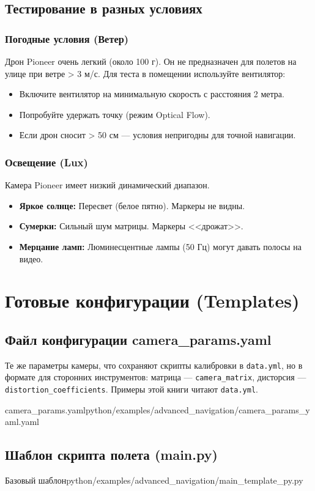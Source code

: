 \subsection{Тестирование в разных условиях}

\subsubsection{Погодные условия (Ветер)}
Дрон Pioneer очень легкий (около 100 г). Он не предназначен для полетов на улице при ветре > 3 м/с.
Для теста в помещении используйте вентилятор:
\begin{itemize}
    \item Включите вентилятор на минимальную скорость с расстояния 2 метра.
    \item Попробуйте удержать точку (режим Optical Flow).
    \item Если дрон сносит > 50 см — условия непригодны для точной навигации.
\end{itemize}

\subsubsection{Освещение (Lux)}
Камера Pioneer имеет низкий динамический диапазон.
\begin{itemize}
    \item \textbf{Яркое солнце:} Пересвет (белое пятно). Маркеры не видны.
    \item \textbf{Сумерки:} Сильный шум матрицы. Маркеры <<дрожат>>.
    \item \textbf{Мерцание ламп:} Люминесцентные лампы (50 Гц) могут давать полосы на видео.
\end{itemize}

\section{Готовые конфигурации (Templates)}

\subsection{Файл конфигурации camera\_params.yaml}
Те же параметры камеры, что сохраняют скрипты калибровки в \texttt{data.yml}, но в формате для сторонних инструментов: матрица --- \texttt{camera\_matrix}, дисторсия --- \texttt{distortion\_coefficients}. Примеры этой книги читают \texttt{data.yml}.
\begin{codefiletitle}[bash]{camera_params.yaml}{python/examples/advanced_navigation/camera_params_yaml.yaml}
\end{codefiletitle}

\subsection{Шаблон скрипта полета (main.py)}
\begin{codefiletitle}[python]{Базовый шаблон}{python/examples/advanced_navigation/main_template_py.py}
\end{codefiletitle}
